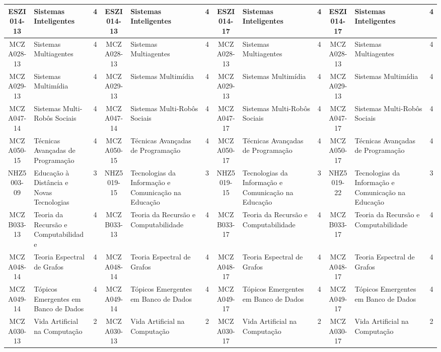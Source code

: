 \documentclass[a4paper]{article}
\begin{document}
\begin{landscape}
{\begin{longtable}{|c|p{.2\textheight}|c||c|p{.2\textheight}|c||c|p{.2\textheight}|c||c|p{.2\textheight}|c|}
ESZI014-13 & Sistemas Inteligentes & 4 &
ESZI014-13 & Sistemas Inteligentes & 4 &
ESZI014-17 & Sistemas Inteligentes & 4 & 
ESZI014-17 & Sistemas Inteligentes & 4\\ \hline

MCZA028-13 & Sistemas Multiagentes & 4 &
MCZA028-13 & Sistemas Multiagentes & 4 &
MCZA028-13 & Sistemas Multiagentes & 4 &
MCZA028-13 & Sistemas Multiagentes & 4\\ \hline

MCZA029-13 & Sistemas Multimídia & 4 &
MCZA029-13 & Sistemas Multimídia & 4 &
MCZA029-13 & Sistemas Multimídia & 4 &
MCZA029-13 & Sistemas Multimídia & 4\\ \hline

MCZA047-14 & Sistemas Multi-Robôs Sociais & 4 &
MCZA047-14 & Sistemas Multi-Robôs Sociais & 4 &
MCZA047-17 & Sistemas Multi-Robôs Sociais & 4 &
MCZA047-17 & Sistemas Multi-Robôs Sociais & 4\\ \hline

MCZA050-15 & Técnicas Avançadas de Programação & 4 &
MCZA050-15 & Técnicas Avançadas de Programação & 4 &
MCZA050-17 & Técnicas Avançadas de Programação & 4 &
MCZA050-17 & Técnicas Avançadas de Programação & 4\\ \hline

NHZ5003-09 & Educação à Distância e Novas Tecnologias & 3 &
NHZ5019-15 & Tecnologias da Informação e Comunicação na Educação & 3 &
NHZ5019-15 & Tecnologias da Informação e Comunicação na Educação & 3 &
NHZ5019-22 & Tecnologias da Informação e Comunicação na Educação & 3\\ \hline

MCZB033-13 & Teoria da Recursão e Computabilidade & 4 &
MCZB033-13 & Teoria da Recursão e Computabilidade & 4 &
MCZB033-17 & Teoria da Recursão e Computabilidade & 4 &
MCZB033-17 & Teoria da Recursão e Computabilidade & 4\\ \hline

MCZA048-14 & Teoria Espectral de Grafos & 4 &
MCZA048-14 & Teoria Espectral de Grafos & 4 &
MCZA048-17 & Teoria Espectral de Grafos & 4 &
MCZA048-17 & Teoria Espectral de Grafos & 4\\ \hline

MCZA049-14 & Tópicos Emergentes em Banco de Dados & 4 &
MCZA049-14 & Tópicos Emergentes em Banco de Dados & 4 &
MCZA049-17 & Tópicos Emergentes em Banco de Dados & 4 &
MCZA049-17 & Tópicos Emergentes em Banco de Dados & 4\\ \hline

MCZA030-13 & Vida Artificial na Computação & 2 &
MCZA030-13 & Vida Artificial na Computação & 2 &
MCZA030-17 & Vida Artificial na Computação & 2 &
MCZA030-17 & Vida Artificial na Computação & 2\\ \hline


\end{longtable}}
\end{landscape}
\end{document}
